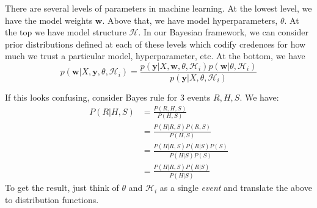 There are several levels of parameters in machine learning. At the lowest level, we have the model weights $\mathbf{w}$. Above that, we have model hyperparameters, $\theta$. At the top we have model structure $\mathcal{H}$. In our Bayesian framework, we can consider prior distributions defined at each of these levels which codify credences for how much we trust a particular model, hyperparameter, etc. At the bottom, we have
\begin{equation}
  p(\mathbf{w} \vert X, \mathbf{y}, \theta, \mathcal{H}_i) = \frac{p(\mathbf{y} \vert X, \mathbf{w}, \theta, \mathcal{H}_i) p(\mathbf{w}\vert \theta, \mathcal{H}_i) }{p(\mathbf{y}\vert X, \theta, \mathcal{H}_i)}
\end{equation}

If this looks confusing, consider Bayes rule for 3 events $R, H, S$. We have:
\begin{align}
  P(R \vert H, S) &= \frac{P(R,H,S)}{P(H,S)} \\
  &= \frac{P(H \vert R, S)P(R, S)}{P(H,S)}\\
  &= \frac{P(H \vert R, S)P(R\vert S)P(S)}{P(H\vert S)P(S)} \\
  &= \frac{P(H \vert R, S)P(R\vert S)}{P(H\vert S)}
\end{align}
To get the result, just think of $\theta$ and $\mathcal{H}_i$ as a single \textit{event} and translate the above to distribution functions. %

